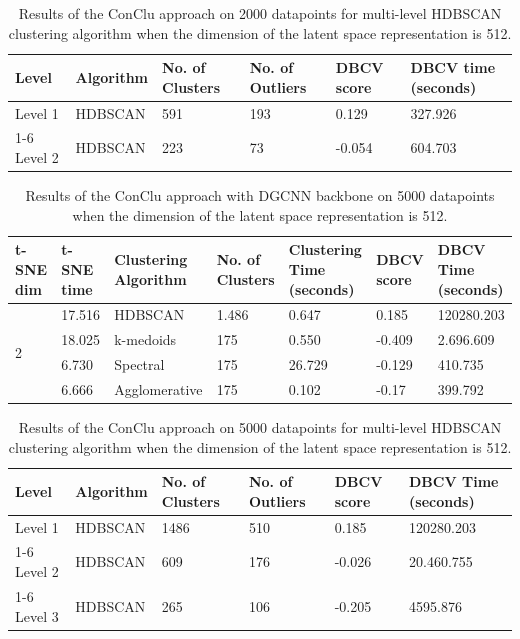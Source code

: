 \begin{table}[H]
  \setlength\extrarowheight{10pt}
  \caption{Results of the ConClu approach on 2000 datapoints for multi-level \ac{HDBSCAN} clustering algorithm when the dimension of the latent space representation is 512. }
  \centering
  \begin{tabular}{|l|l|l|l|l|l|}
    \toprule
    Level & Algorithm	& No. of Clusters	& No. of Outliers	& DBCV score	& \ac{DBCV} time (seconds)	\\  
    \midrule
    Level 1 & \ac{HDBSCAN} & 591	& 193	& 0.129	& 327.926 \\ \cline{1-6}
    Level 2 & \ac{HDBSCAN} & 223	& 73	& -0.054	& 604.703
    \\ 
    \bottomrule
  \end{tabular}
  \label{tab:dgcnn_2000_levels}
\end{table} 

\begin{table}[H]
  \setlength\extrarowheight{10pt}
  \caption{Results of the ConClu approach with \ac{DGCNN} backbone on 5000 datapoints when the dimension of the latent space representation is 512. }
  \centering
  \begin{tabular}{|p{30pt}|p{50pt}|p{60pt}|p{50pt}|p{50pt}|p{40pt}|p{50pt}|}
    \toprule
    \ac{t-SNE} dim	& \ac{t-SNE} time & Clustering Algorithm & No. of Clusters & Clustering Time (seconds) & \ac{DBCV} score & \ac{DBCV} Time (seconds)\\
    \midrule
    \multirow{4}{30pt}{2}	& 17.516	& \ac{HDBSCAN}	& 1.486	& 0.647	& 0.185	& 120280.203 \\ \cline{2-7} 
    & 18.025	& k-medoids	& 175	& 0.550	& -0.409	& 2.696.609 \\ \cline{2-7} 
    & 6.730	& Spectral	& 175	& 26.729	& -0.129	& 410.735 \\ \cline{2-7}
    & 6.666	& Agglomerative	& 175	& 0.102	& -0.17	& 399.792 \\ 
    \bottomrule
  \end{tabular}
  \label{tab:dgcnn_5000}
\end{table}

\begin{table}[H]
  \setlength\extrarowheight{10pt}
  \caption{Results of the ConClu approach on 5000 datapoints for multi-level \ac{HDBSCAN} clustering algorithm when the dimension of the latent space representation is 512. }
  \centering
  \begin{tabular}{|l|l|l|l|l|l|}
    \toprule
    Level & Algorithm	& No. of Clusters	& No. of Outliers	& DBCV score	& \ac{DBCV} Time (seconds)	\\  
    \midrule
    Level 1 & \ac{HDBSCAN} & 1486	& 510	& 0.185	& 120280.203 \\ \cline{1-6}
    Level 2 & \ac{HDBSCAN} & 609	& 176	& -0.026	& 20.460.755 \\ \cline{1-6}
    Level 3 & \ac{HDBSCAN} & 265	& 106	& -0.205	& 4595.876 \\
    \bottomrule
  \end{tabular}
  \label{tab:dgcnn_5000_levels}
\end{table} 

